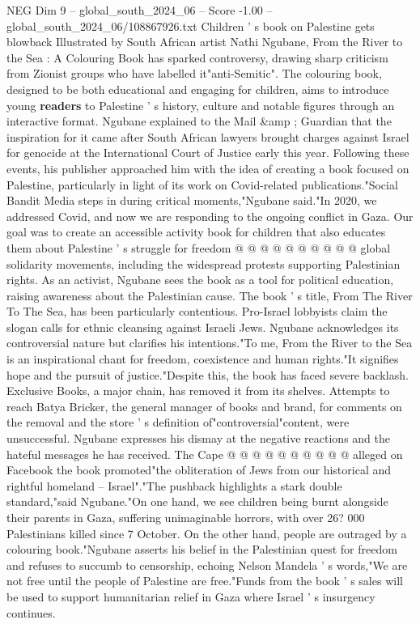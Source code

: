 \begin{textsample}{NEG Dim 9 – global\_south\_2024\_06 – Score -1.00 – global\_south\_2024\_06/108867926.txt}  \label{ex:f9_neg_405}
Children ' s book on Palestine gets blowback Illustrated by South African artist Nathi Ngubane, From the River to the Sea : A Colouring Book has sparked controversy, drawing sharp criticism from Zionist groups who have labelled it"anti-Semitic".
The colouring book, designed to be both educational and engaging for children, aims to introduce young \textbf{readers} to Palestine ' s history, culture and notable figures through an interactive format.
Ngubane explained to the Mail \&amp ; Guardian that the inspiration for it came after South African lawyers brought charges against Israel for genocide at the International Court of Justice early this year.
Following these events, his publisher approached him with the idea of creating a book focused on Palestine, particularly in light of its work on Covid-related publications."Social Bandit Media steps in during critical moments,"Ngubane said."In 2020, we addressed Covid, and now we are responding to the ongoing conflict in Gaza.
Our goal was to create an accessible activity book for children that also educates them about Palestine ' s struggle for freedom @ @ @ @ @ @ @ @ @ @ global solidarity movements, including the widespread protests supporting Palestinian rights.
As an activist, Ngubane sees the book as a tool for political education, raising awareness about the Palestinian cause.
The book ' s title, From The River To The Sea, has been particularly contentious.
Pro-Israel lobbyists claim the slogan calls for ethnic cleansing against Israeli Jews.
Ngubane acknowledges its controversial nature but clarifies his intentions."To me, From the River to the Sea is an inspirational chant for freedom, coexistence and human rights."It signifies hope and the pursuit of justice."Despite this, the book has faced severe backlash.
Exclusive Books, a major chain, has removed it from its shelves.
Attempts to reach Batya Bricker, the general manager of books and brand, for comments on the removal and the store ' s definition of"controversial"content, were unsuccessful.
Ngubane expresses his dismay at the negative reactions and the hateful messages he has received.
The Cape @ @ @ @ @ @ @ @ @ @ alleged on Facebook the book promoted"the obliteration of Jews from our historical and rightful homeland -- Israel"."The pushback highlights a stark double standard,"said Ngubane."On one hand, we see children being burnt alongside their parents in Gaza, suffering unimaginable horrors, with over 26? 000 Palestinians killed since 7 October.
On the other hand, people are outraged by a colouring book."Ngubane asserts his belief in the Palestinian quest for freedom and refuses to succumb to censorship, echoing Nelson Mandela ' s words,"We are not free until the people of Palestine are free."Funds from the book ' s sales will be used to support humanitarian relief in Gaza where Israel ' s insurgency continues.

\end{textsample}
